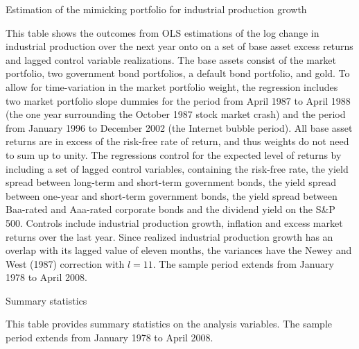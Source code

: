 \documentclass[12pt,a4paper]{ouparticle}
\begin{document}
\begin{table}
  \begin{threeparttable}
    \caption{Estimation of the mimicking portfolio for industrial production growth}
    
    \begin{tablenotes} 
    \footnotesize
    \item This table shows the outcomes from OLS estimations of the log change in industrial production over the next year onto on a set of base asset excess returns and lagged control variable realizations. The base assets consist of the market portfolio, two government bond portfolios, a default bond portfolio, and gold. To allow for time-variation in the market portfolio weight, the regression includes two market portfolio slope dummies for the period from April 1987 to April 1988 (the one year surrounding the October 1987 stock market crash) and the period from January 1996 to December 2002 (the Internet bubble period). All base asset returns are in excess of the risk-free rate of return, and thus weights do not need to sum up to unity. The regressions control for the expected level of returns by including a set of lagged control variables, containing the risk-free rate, the yield spread between long-term and short-term government bonds, the yield spread between one-year and short-term government bonds, the yield spread between Baa-rated and Aaa-rated corporate bonds and the dividend yield on the S\&P 500. Controls include industrial production growth, inflation and excess market returns over the last year. Since realized industrial production growth has an overlap with its lagged value of eleven months, the variances have the Newey and West (1987) correction with $l = 11$. The sample period extends from January 1978 to April 2008.
    \end{tablenotes}
  \end{threeparttable}
\end{table}

\begin{table}
  \begin{threeparttable}
    \caption{Summary statistics}
    
    \begin{tablenotes} 
    \small 
    \item This table provides summary statistics on the analysis variables. The sample period extends from January 1978 to April 2008.
    \end{tablenotes}
  \end{threeparttable}
\end{table}
\end{document}
